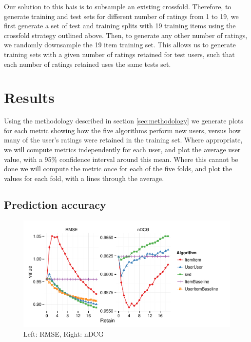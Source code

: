 \documentclass[letterpaper]{sig-alternate}
\begin{document}
  Our solution to this bais is to subsample an existing crossfold.
  Therefore, to generate training and test sets for different number of ratings from 1 to 19, we first generate a set of test and training splits with 19 training items using the crossfold strategy outlined above.
  Then, to generate any other number of ratings, we randomly downsample the 19 item training set.
  This allows us to generate training sets with a given number of ratings retained for test users, such that each number of ratings retained uses the same tests set.

\section{Results}

  Using the methodology described in section \ref{sec:methodology} we generate plots for each metric showing how the five algorithms perform new users, versus how many of the user's ratings were retained in the training set.
  Where appropriate, we will compute metrics independently for each user, and plot the average user value, with a 95\% confidence interval around this mean.
  Where this cannot be done we will compute the metric once for each of the five folds, and plot the values for each fold, with a lines through the average.

\subsection{Prediction accuracy}
\begin{figure}[ht!]
  \centering
  \includegraphics[width=0.75\linewidth]{../lenskit/output/ekstrandTuned20/accuracy.pdf}
  \caption{Left: RMSE, Right: nDCG}
  \label{fig:rmse}
  \label{fig:ndcg}
\end{figure}
\end{document}
